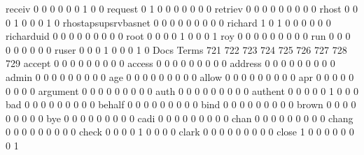 \documentclass[compress,8pt]{beamer}
\begin{document}
\begin{frame}
\begin{Schunk}
  receiv                                     0   0   0   0   0   0   1   0   0
  request                                    0   1   0   0   0   0   0   0   0
  retriev                                    0   0   0   0   0   0   0   0   0
  rhost                                      0   0   0   1   0   0   0   1   0
  rhostapsupsrvbasnet                        0   0   0   0   0   0   0   0   0
  richard                                    1   0   1   0   0   0   0   0   0
  richarduid                                 0   0   0   0   0   0   0   0   0
  root                                       0   0   0   0   1   0   0   0   1
  roy                                        0   0   0   0   0   0   0   0   0
  run                                        0   0   0   0   0   0   0   0   0
  ruser                                      0   0   0   1   0   0   0   1   0
                                          Docs
Terms                                      721 722 723 724 725 726 727 728 729
  accept                                     0   0   0   0   0   0   0   0   0
  access                                     0   0   0   0   0   0   0   0   0
  address                                    0   0   0   0   0   0   0   0   0
  admin                                      0   0   0   0   0   0   0   0   0
  age                                        0   0   0   0   0   0   0   0   0
  allow                                      0   0   0   0   0   0   0   0   0
  apr                                        0   0   0   0   0   0   0   0   0
  argument                                   0   0   0   0   0   0   0   0   0
  auth                                       0   0   0   0   0   0   0   0   0
  authent                                    0   0   0   0   0   1   0   0   0
  bad                                        0   0   0   0   0   0   0   0   0
  behalf                                     0   0   0   0   0   0   0   0   0
  bind                                       0   0   0   0   0   0   0   0   0
  brown                                      0   0   0   0   0   0   0   0   0
  bye                                        0   0   0   0   0   0   0   0   0
  cadi                                       0   0   0   0   0   0   0   0   0
  chan                                       0   0   0   0   0   0   0   0   0
  chang                                      0   0   0   0   0   0   0   0   0
  check                                      0   0   0   0   1   0   0   0   0
  clark                                      0   0   0   0   0   0   0   0   0
  close                                      1   0   0   0   0   0   0   0   1

\end{Schunk}
\end{frame}
\end{document}

